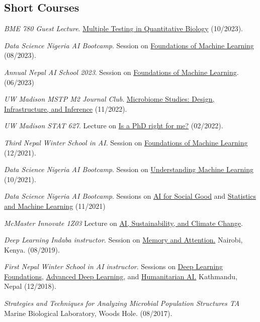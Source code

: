 \documentclass[letterpaper]{article}
\renewenvironment{itemize}{
  \begin{list}{}{
    \setlength{\leftmargin}{1.5em}
  }
}{
  \end{list}
}
\begin{document}
\subsection*{Short Courses}
\begin{itemize}
\item \textit{BME 780 Guest Lecture}. \href{https://krisrs1128.github.io/talks/2023/20231010/20231010.html}{Multiple Testing in Quantitative Biology} (10/2023).
\item \textit{Data Science Nigeria AI Bootcamp}. Session on \href{http://krisrs1128.github.io/dsn_foundations_2023}{Foundations of Machine Learning} (08/2023).
\item \textit{Annual Nepal AI School 2023}. Session on \href{http://krisrs1128.github.io/naamii_summer_2023}{Foundations
of Machine Learning}. (06/2023) 
\item \textit{UW Madison MSTP M2 Journal Club}. \href{https://krisrs1128.github.io/talks/2022/20221128/20221128.html}{Microbiome Studies: Design, Infrastructure, and Inference} (11/2022).
\item \textit{UW Madison STAT 627}. Lecture on \href{https://drive.google.com/file/d/1kq0xJ3XS98igzxFcJOTFUEz2DtoRByCg/view?usp=sharing}{Is a PhD right for me?} (02/2022).
\item \textit{Third Nepal Winter School in AI}. Session on
\href{https://krisrs1128.github.io/winter_school_2021/index.html}{Foundations
of Machine Learning} (12/2021).
\item \textit{Data Science Nigeria AI Bootcamp}.
Session on \href{https://drive.google.com/file/d/1bgYQb8z1iCjHyOG1gVWeJJCSPdssndVP/view}{Understanding Machine Learning} (10/2021).
\item \textit{Data Science Nigeria AI Bootcamp}.
Sessions on \href{https://www.youtube.com/watch?v=7_8DUN-6tpI&}{AI for Social Good} and \href{https://www.youtube.com/watch?v=EefWzpRkIVM}{Statistics and Machine Learning} (11/2021)
\item \textit{McMaster Innovate 1Z03} Lecture on
\href{https://docs.google.com/presentation/d/1JWV8_VXYzCzipr6EJZdcdaPY5pz2Cp4F/edit#slide=id.p1}{AI,
Sustainability, and Climate Change}.
\item \textit{Deep Learning Indaba instructor}.
Session on \href{https://www.youtube.com/watch?v=9mWYFZwNpis}{Memory and Attention.}
Nairobi, Kenya. (08/2019).
\item \textit{First Nepal Winter School in AI instructor}.
Sessions on \href{https://www.youtube.com/watch?v=3lBMxO2zmGg}{Deep Learning Foundations}, \href{https://www.youtube.com/watch?v=OLaX-jmRUwY}{Advanced Deep Learning}, and \href{https://www.youtube.com/watch?v=RXZyGwa4TpY}{Humanitarian AI.}
Kathmandu, Nepal (12/2018).
\item \textit{Strategies and Techniques for Analyzing Microbial Population Structures TA}
  Marine Biological Laboratory, Woods Hole.
  (08/2017).
\end{itemize}
\end{document}
